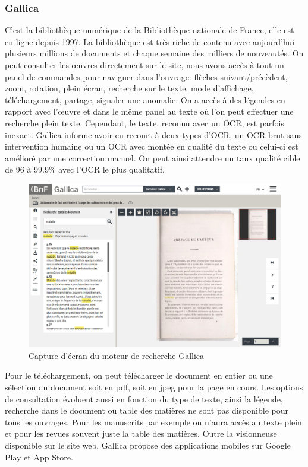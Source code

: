         \subsubsection{Gallica}
        \label{subsubsec:gallica}
        C’est la bibliothèque numérique de la Bibliothèque nationale de France, elle est en ligne depuis 1997. La bibliothèque
        est très riche de contenu avec aujourd’hui plusieurs millions de documents et chaque semaine des milliers de nouveautés.
        On peut consulter les œuvres directement sur le site, nous avons accès à tout un panel de commandes pour naviguer dans l’ouvrage:
        flèches suivant/précèdent, zoom, rotation, plein écran, recherche sur le texte, mode d’affichage, téléchargement, partage, signaler une anomalie.
        On a accès à des légendes en rapport avec l’œuvre et dans le même panel au texte où l’on peut effectuer une recherche plein texte. Cependant,
        le texte, reconnu avec un OCR, est parfois inexact. Gallica informe avoir eu recourt à deux types d’OCR, un OCR brut sans intervention humaine
        ou un OCR avec montée en qualité du texte ou celui-ci est amélioré par une correction manuel. On peut ainsi attendre un taux qualité cible de
        96 à 99.9\% avec l’OCR le plus qualitatif.

        \begin{figure}[ht!]
            \centering
            \includegraphics[width=1\textwidth]{figure/screenshot_gallica.jpg}
            \caption{Capture d'écran du moteur de recherche Gallica}
            \label{fig:gallica}
        \end{figure}

        Pour le téléchargement, on peut télécharger le document en entier ou une sélection du document soit en pdf, soit en jpeg pour la page en cours.
        Les options de consultation évoluent aussi en fonction du type de texte, ainsi la légende, recherche dans le document ou table des matières
        ne sont pas disponible pour tous les ouvrages. Pour les manuscrits par exemple on n’aura accès au texte plein et pour les revues souvent juste
        la table des matières. Outre la visionneuse disponible sur le site web, Gallica propose des applications mobiles sur Google Play et App Store.
